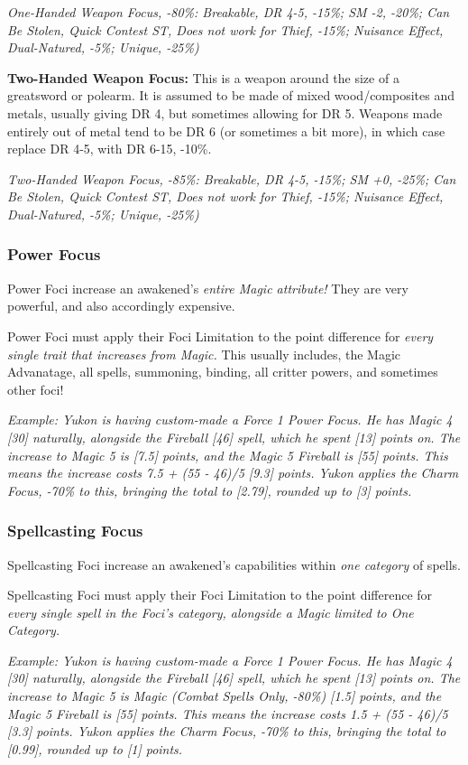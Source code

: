 \begin{multicols*}{2}
	\textcolor{OliveGreen}{\textit{One-Handed Weapon Focus, -80\%: Breakable, DR 4-5, -15\%; SM -2, -20\%; Can Be Stolen, Quick Contest ST, Does not work for Thief, -15\%; Nuisance Effect, Dual-Natured, -5\%; Unique, -25\%)}}
	
	\textbf{Two-Handed Weapon Focus:} This is a weapon around the size of a greatsword or polearm. It is assumed to be made of mixed wood/composites and metals, usually giving DR 4, but sometimes allowing for DR 5. Weapons made entirely out of metal tend to be DR 6 (or sometimes a bit more), in which case replace DR 4-5, with DR 6-15, -10\%.
	
	\textcolor{OliveGreen}{\textit{Two-Handed Weapon Focus, -85\%: Breakable, DR 4-5, -15\%; SM +0, -25\%; Can Be Stolen, Quick Contest ST, Does not work for Thief, -15\%; Nuisance Effect, Dual-Natured, -5\%; Unique, -25\%)}}
	
	\subsubsection{Power Focus} Power Foci increase an awakened's \textit{entire Magic attribute!} They are very powerful, and also accordingly expensive.
	
	Power Foci must apply their Foci Limitation to the point difference for \textit{every single trait that increases from Magic.} This usually includes, the Magic Advanatage, all spells, summoning, binding, all critter powers, and sometimes other foci!
	
	\textcolor{OliveGreen}{\textit{Example: Yukon is having custom-made a Force 1 Power Focus. He has Magic 4 [30] naturally, alongside the Fireball [46] spell, which he spent [13] points on. The increase to Magic 5 is [7.5] points, and the Magic 5 Fireball is [55] points. This means the increase costs 7.5 + (55 - 46)/5 [9.3] points. Yukon applies the Charm Focus, -70\% to this, bringing the total to [2.79], rounded up to [3] points.}}
	
	\subsubsection{Spellcasting Focus} Spellcasting Foci increase an awakened's capabilities within \textit{one category} of spells.
	
	Spellcasting Foci must apply their Foci Limitation to the point difference for \textit{every single spell in the Foci's category, alongside a Magic limited to One Category.}
	
	\textcolor{OliveGreen}{\textit{Example: Yukon is having custom-made a Force 1 Power Focus. He has Magic 4 [30] naturally, alongside the Fireball [46] spell, which he spent [13] points on. The increase to Magic 5 is Magic (Combat Spells Only, -80\%) [1.5] points, and the Magic 5 Fireball is [55] points. This means the increase costs 1.5 + (55 - 46)/5 [3.3] points. Yukon applies the Charm Focus, -70\% to this, bringing the total to [0.99], rounded up to [1] points.}}
	

\end{multicols*}

